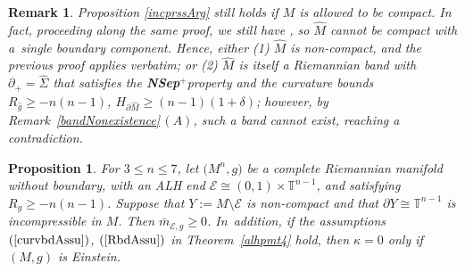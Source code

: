 \documentclass[10pt,a4paper]{amsart}
\numberwithin{equation}{section}
\newtheorem{Prop}[Theorem]{Proposition}
\newtheorem{Remark}[Theorem]{Remark} }
\def\T{\mathbb{T}}
\def\Z{\mathbb{Z}}
\def\Ecal{\mathcal{E}}
\def\Nsep{\textbf{\textup{NSep}$^+$}}
\begin{document}
\begin{Remark}
Proposition \ref{incprssArg} still holds if $M$ is allowed to be compact.
In fact, proceeding along the same proof, we still have \smash{$\big[\hat \Sigma\big]\ne 0\in H_{n-1}\big(\hat M;\Z\big)$}, so
$\hat M$ cannot be compact with a~single boundary component.
Hence, either (1) $\hat M$ is non-compact, and the previous proof applies verbatim;
or (2) $\hat M$ is itself a Riemannian band with $\partial_+ = \hat\Sigma$ that
satisfies the \Nsep property and the curvature bounds $R_{\hat g}\ge -n(n-1)$,
$H_{\partial \hat M}\ge (n-1)(1+\delta)$; however, by
Remark~\ref{bandNonexistence}\,$(A)$, such a band cannot exist, reaching a contradiction.
\end{Remark}

\begin{Prop}\label{alhPrep}
	For $3\le n\le 7$, let $\big(M^n,g\big)$ be a complete Riemannian manifold without boundary, with an ALH end
	$\Ecal\cong (0,1)\times \T^{n-1}$, and satisfying $R_g\ge -n(n-1)$.
	Suppose that $Y:=M\setminus \Ecal$ is non-compact and that $\partial Y\cong \T^{n-1}$
	is incompressible in $M$. Then $\bar m_{\Ecal, g}\ge 0$.
	In~addition, if the assumptions $(\ref{curvbdAssu})$, $(\ref{RbdAssu})$ in Theorem~{\rm \ref{alhpmt4}} hold,
	then $\kappa = 0$ only if $(M,g)$ is Einstein.
\end{Prop}
\end{document}
